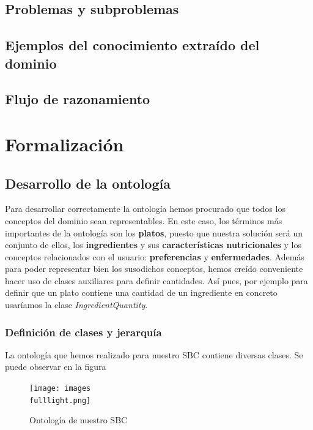 \documentclass[12]{article}
\begin{document}
\subsection{Problemas y subproblemas}
\subsection{Ejemplos del conocimiento extraído del dominio}
\subsection{Flujo de razonamiento}
\section{Formalización}

\subsection{Desarrollo de la ontología}
Para desarrollar correctamente la ontología hemos procurado que todos los conceptos del dominio sean representables. En este caso, los términos más importantes de la ontología son los \textbf{platos}, puesto que nuestra solución será un conjunto de ellos, los \textbf{ingredientes} y sus \textbf{características nutricionales} y los conceptos relacionados con el usuario: \textbf{preferencias} y \textbf{enfermedades}. Además para poder representar bien los susodichos conceptos, hemos creído conveniente hacer uso de clases auxiliares para definir cantidades. Así pues, por ejemplo para definir que un plato contiene una cantidad de un ingrediente en concreto usaríamos la clase \textit{IngredientQuantity}.
\label{ontologia_apartado}
\subsubsection{Definición de clases y jerarquía}

La ontología que hemos realizado para nuestro SBC contiene diversas clases. Se puede observar en la figura %

\begin{figure}[H]
\centering
\texttt{[image: images\\fulllight.png]}
\caption{Ontología de nuestro SBC}
\label{ontologia}
\end{figure}
\end{document}
